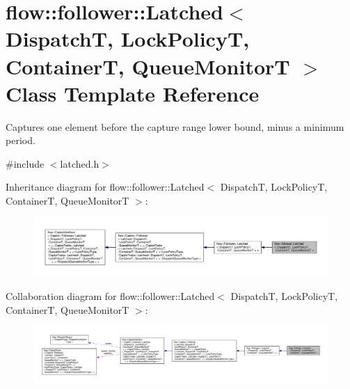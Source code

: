 \hypertarget{classflow_1_1follower_1_1_latched}{}\section{flow\+:\+:follower\+:\+:Latched$<$ DispatchT, Lock\+PolicyT, ContainerT, Queue\+MonitorT $>$ Class Template Reference}
\label{classflow_1_1follower_1_1_latched}


Captures one element before the capture range lower bound, minus a minimum period.  




{\ttfamily \#include $<$latched.\+h$>$}



Inheritance diagram for flow\+:\+:follower\+:\+:Latched$<$ DispatchT, Lock\+PolicyT, ContainerT, Queue\+MonitorT $>$\+:
\nopagebreak
\begin{figure}[H]
\begin{center}
\leavevmode
\includegraphics[width=350pt]{classflow_1_1follower_1_1_latched__inherit__graph}
\end{center}
\end{figure}


Collaboration diagram for flow\+:\+:follower\+:\+:Latched$<$ DispatchT, Lock\+PolicyT, ContainerT, Queue\+MonitorT $>$\+:
\nopagebreak
\begin{figure}[H]
\begin{center}
\leavevmode
\includegraphics[width=350pt]{classflow_1_1follower_1_1_latched__coll__graph}
\end{center}
\end{figure}

